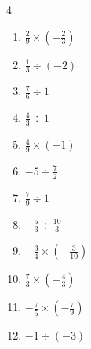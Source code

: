 \begin{multicols}{4}
\begin{enumerate}
  \item $\displaystyle \frac{2}{9}\times{}\left(-\frac{2}{3}\right)$


  \item $\displaystyle \frac{1}{3}\div{}\left(-2\right)$


  \item $\displaystyle \frac{7}{6}\div{}1$


  \item $\displaystyle \frac{4}{3}\div{}1$


  \item $\displaystyle \frac{4}{9}\times{}\left(-1\right)$


  \item $\displaystyle -5\div{}\frac{7}{2}$


  \item $\displaystyle \frac{7}{9}\div{}1$


  \item $\displaystyle -\frac{5}{3}\div{}\frac{10}{3}$


  \item $\displaystyle -\frac{3}{4}\times{}\left(-\frac{3}{10}\right)$


  \item $\displaystyle \frac{7}{3}\times{}\left(-\frac{4}{3}\right)$


\columnbreak %

  \item $\displaystyle -\frac{7}{5}\times{}\left(-\frac{7}{9}\right)$


  \item $\displaystyle -1\div{}\left(-3\right)$


\end{enumerate}
\end{multicols}
